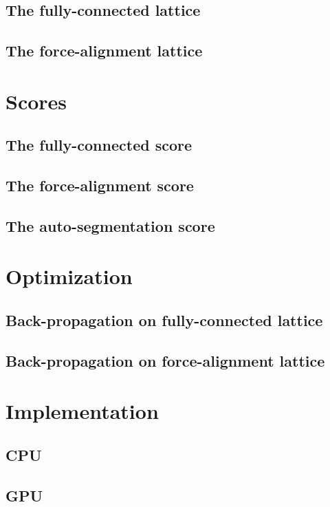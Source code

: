 \documentclass[a4paper]{article}
\begin{document}
\subsection{The fully-connected lattice}

\subsection{The force-alignment lattice}

\section{Scores}

\subsection{The fully-connected score}

\subsection{The force-alignment score}

\subsection{The auto-segmentation score}

\section{Optimization}

\subsection{Back-propagation on fully-connected lattice}

\subsection{Back-propagation on force-alignment lattice}

\section{Implementation}

\subsection{CPU}

\subsection{GPU}
\end{document}
